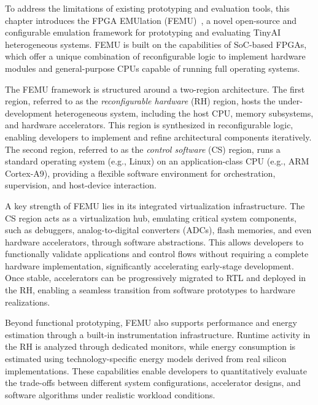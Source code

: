         To address the limitations of existing prototyping and evaluation tools, this chapter introduces the FPGA EMUlation (\mbox{FEMU})~\cite{femu}, a novel open-source and configurable emulation framework for prototyping and evaluating TinyAI heterogeneous systems. \mbox{FEMU} is built on the capabilities of SoC-based FPGAs, which offer a unique combination of reconfigurable logic to implement hardware modules and general-purpose CPUs capable of running full operating systems.

        The \mbox{FEMU} framework is structured around a two-region architecture. The first region, referred to as the \emph{reconfigurable hardware} (RH) region, hosts the under-development heterogeneous system, including the host CPU, memory subsystems, and hardware accelerators. This region is synthesized in reconfigurable logic, enabling developers to implement and refine architectural components iteratively. The second region, referred to as the \emph{control software} (CS) region, runs a standard operating system (e.g., Linux) on an application-class CPU (e.g., ARM Cortex-A9), providing a flexible software environment for orchestration, supervision, and host-device interaction.

        A key strength of \mbox{FEMU} lies in its integrated virtualization infrastructure. The CS region acts as a virtualization hub, emulating critical system components, such as debuggers, analog-to-digital converters (ADCs), flash memories, and even hardware accelerators, through software abstractions. This allows developers to functionally validate applications and control flows without requiring a complete hardware implementation, significantly accelerating early-stage development. Once stable, accelerators can be progressively migrated to RTL and deployed in the RH, enabling a seamless transition from software prototypes to hardware realizations.

        Beyond functional prototyping, \mbox{FEMU} also supports performance and energy estimation through a built-in instrumentation infrastructure. Runtime activity in the RH is analyzed through dedicated monitors, while energy consumption is estimated using technology-specific energy models derived from real silicon implementations. These capabilities enable developers to quantitatively evaluate the trade-offs between different system configurations, accelerator designs, and software algorithms under realistic workload conditions.

